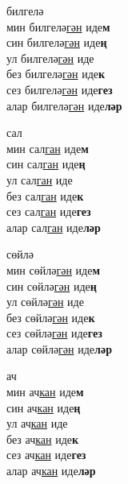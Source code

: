 \begin{multicols}{4}
\begin{enumerate}
\begin{minipage}{\linewidth}
    \item
    билгелә\\
    мин билгелә\underline{гән} иде\textbf{м}\\
    син билгелә\underline{гән} иде\textbf{ң}\\
    ул билгелә\underline{гән} иде\\
    без билгелә\underline{гән} иде\textbf{к}\\
    сез билгелә\underline{гән} иде\textbf{гез}\\
    алар билгелә\underline{гән} иде\textbf{ләр}\\
\end{minipage}

\begin{minipage}{\linewidth}
    \item
    сал\\
    мин сал\underline{ган} иде\textbf{м}\\
    син сал\underline{ган} иде\textbf{ң}\\
    ул сал\underline{ган} иде\\
    без сал\underline{ган} иде\textbf{к}\\
    сез сал\underline{ган} иде\textbf{гез}\\
    алар сал\underline{ган} иде\textbf{ләр}\\
\end{minipage}

\begin{minipage}{\linewidth}
    \item
    сөйлә\\
    мин сөйлә\underline{гән} иде\textbf{м}\\
    син сөйлә\underline{гән} иде\textbf{ң}\\
    ул сөйлә\underline{гән} иде\\
    без сөйлә\underline{гән} иде\textbf{к}\\
    сез сөйлә\underline{гән} иде\textbf{гез}\\
    алар сөйлә\underline{гән} иде\textbf{ләр}\\
\end{minipage}

\begin{minipage}{\linewidth}
    \item
    ач\\
    мин ач\underline{кан} иде\textbf{м}\\
    син ач\underline{кан} иде\textbf{ң}\\
    ул ач\underline{кан} иде\\
    без ач\underline{кан} иде\textbf{к}\\
    сез ач\underline{кан} иде\textbf{гез}\\
    алар ач\underline{кан} иде\textbf{ләр}\\
\end{minipage}


\end{enumerate}
\end{multicols}
